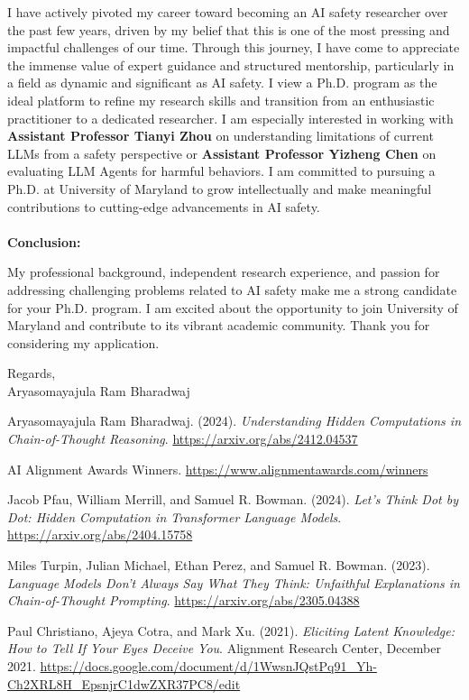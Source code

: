 \documentclass[12pt]{article}
\begin{document}
I have actively pivoted my career toward becoming an AI safety researcher over the past few years, driven by my belief that this is one of the most pressing and impactful challenges of our time. Through this journey, I have come to appreciate the immense value of expert guidance and structured mentorship, particularly in a field as dynamic and significant as AI safety. I view a Ph.D. program as the ideal platform to refine my research skills and transition from an enthusiastic practitioner to a dedicated researcher. I am especially interested in working with \textbf{Assistant Professor Tianyi Zhou} on understanding limitations of current LLMs from a safety perspective or \textbf{Assistant Professor Yizheng Chen} on evaluating LLM Agents for harmful behaviors. I am committed to pursuing a Ph.D. at University of Maryland to grow intellectually and make meaningful contributions to cutting-edge advancements in AI safety.
\\
\\
\textbf{Conclusion:}

My professional background, independent research experience, and passion for addressing challenging problems related to AI safety make me a strong candidate for your Ph.D. program. I am excited about the opportunity to join University of Maryland and contribute to its vibrant academic community. Thank you for considering my application.

Regards,\\
Aryasomayajula Ram Bharadwaj

\newpage
\begin{thebibliography}{9}

Aryasomayajula Ram Bharadwaj. (2024). \emph{Understanding Hidden Computations in Chain-of-Thought Reasoning}.  
\url{https://arxiv.org/abs/2412.04537}

AI Alignment Awards Winners.  
\url{https://www.alignmentawards.com/winners}

Jacob Pfau, William Merrill, and Samuel R. Bowman. (2024). \emph{Let's Think Dot by Dot: Hidden Computation in Transformer Language Models}.  
\url{https://arxiv.org/abs/2404.15758}

Miles Turpin, Julian Michael, Ethan Perez, and Samuel R. Bowman. (2023). \emph{Language Models Don't Always Say What They Think: Unfaithful Explanations in Chain-of-Thought Prompting}.  
\url{https://arxiv.org/abs/2305.04388}

Paul Christiano, Ajeya Cotra, and Mark Xu. (2021). \emph{Eliciting Latent Knowledge: How to Tell If Your Eyes Deceive You}. Alignment Research Center, December 2021.  
\url{https://docs.google.com/document/d/1WwsnJQstPq91_Yh-Ch2XRL8H_EpsnjrC1dwZXR37PC8/edit}

\end{thebibliography}
\end{document}
